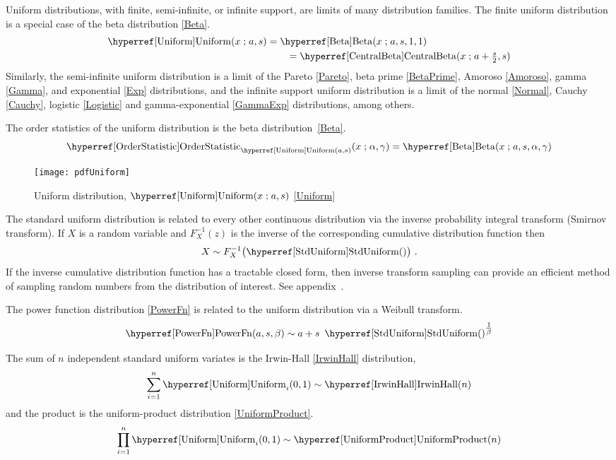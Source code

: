 Uniform distributions, with finite, semi-infinite, or infinite support, are limits of many distribution families. The finite uniform distribution is a special case of the beta distribution \eqref{Beta}.
\begin{align*}
 \opr{Uniform}(x\given a,s)  &=  \opr{Beta}(x\given a, s, 1,1) 	\checked
 \\
 &\qquad=  \opr{CentralBeta}(x\given a+\tfrac{s}{2}, s) \checked
\end{align*}
Similarly, the semi-infinite uniform distribution is a limit of the Pareto \eqref{Pareto}, beta prime \eqref{BetaPrime}, Amoroso \eqref{Amoroso}, gamma \eqref{Gamma}, and exponential  \eqref{Exp} distributions, and the infinite support uniform distribution is a limit of the normal \eqref{Normal}, Cauchy \eqref{Cauchy}, logistic \eqref{Logistic} and  gamma-exponential  \eqref{GammaExp} distributions, among others. 

The order statistics  of the uniform distribution is the beta distribution~\eqref{Beta}.
\[
\opr{OrderStatistic}_{\opr{Uniform}(a,s)}(x \given \alpha, \gamma) =  \opr{Beta}(x\given a, s, \alpha, \gamma) 
\checked
\notag
\]


\begin{figure}[t]
\begin{center}
\texttt{[image: pdfUniform]}
\end{center}
\caption[Uniform distribution]{Uniform distribution, $\opr{Uniform}(x\given a,s)$ \eqref{Uniform}}
\end{figure}


The standard uniform distribution is related to every other continuous distribution via the  inverse probability integral transform (Smirnov transform). If $X$ is a random variable and $F_X^{-1}(z)$ is the inverse of the corresponding cumulative distribution function then 
\[ 
X \sim F_X^{-1}\bigl( \opr{StdUniform}() \bigr) \ .  \checked
\notag
\]
If the inverse cumulative distribution function has a tractable closed form, then inverse transform sampling can provide an efficient method of sampling random numbers from the distribution of interest. See appendix~.

The power function distribution \eqref{PowerFn} is related to the uniform distribution via a Weibull transform.
\[
\opr{PowerFn}(a,s,\beta) \sim a + s\ \opr{StdUniform}()^{\tfrac{1}{\beta}}  \checked
\notag
\]

The sum of $n$ independent standard uniform variates is the  Irwin-Hall \eqref{IrwinHall} distribution,
\[
\sum_{i=1}^{n} \opr{Uniform}_i(0,1)  \sim \opr{IrwinHall}(n) \checked
\notag
\]
and the product is the uniform-product distribution \eqref{UniformProduct}.
\[
\prod_{i=1}^{n} \opr{Uniform}_i(0,1)  \sim \opr{UniformProduct}(n) \checked
\notag
\]




